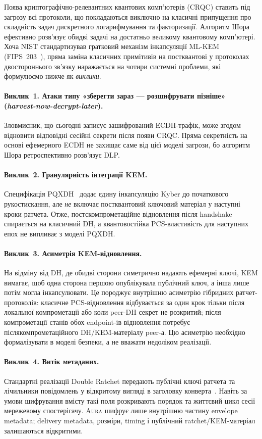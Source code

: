 \documentclass[11pt,a4paper]{article}
\theoremstyle{definition}
\newcommand{\Aura}{\mbox{\normalfont\scshape Aura}}
\begin{document}
Поява криптографічно-релевантних квантових комп'ютерів (CRQC) ставить під
загрозу всі протоколи, що покладаються виключно на класичні припущення про
складність задач дискретного логарифмування та факторизації. Алгоритм
Шора~\cite{shor1997} ефективно розв'язує обидві задачі на достатньо великому
квантовому комп'ютері. Хоча NIST стандартизував гратковий механізм
інкапсуляції ML-KEM (FIPS~203~\cite{fips203}), пряма заміна класичних
примітивів на постквантові у протоколах двостороннього зв'язку наражається
на чотири системні проблеми, які формулюємо нижче як \emph{виклики}.

\paragraph{Виклик~1. Атаки типу «зберегти зараз — розшифрувати пізніше»
(\emph{harvest-now-decrypt-later}).}
Зловмисник, що сьогодні записує зашифрований ECDH-трафік, може згодом
відновити відповідні сесійні секрети після появи CRQC. Пряма секретність на
основі ефемерного ECDH не захищає саме від цієї моделі загрози, бо алгоритм
Шора ретроспективно розв'язує DLP.

\paragraph{Виклик~2. Гранулярність інтеграції KEM.}
Специфікація PQXDH~\cite{signal-pqxdh} додає єдину інкапсуляцію Kyber до
початкового рукостискання, але \emph{не} включає постквантовий ключовий
матеріал у наступні кроки ратчета. Отже, постскомпрометаційне відновлення
після handshake спирається на класичний DH, а квантовостійка PCS-властивість
для наступних епох не випливає з моделі PQXDH.

\paragraph{Виклик~3. Асиметрія KEM-відновлення.}
На відміну від DH, де обидві сторони симетрично надають ефемерні ключі,
KEM вимагає, щоб одна сторона першою опублікувала публічний ключ, а інша
лише потім могла інкапсулювати. Це породжує внутрішню асиметрію
гібридних ратчет-протоколів: класичне PCS-відновлення відбувається
за один крок тільки після локальної компрометації або коли peer-DH секрет
не розкритий; після компрометації станів обох endpoint-ів відновлення
потребує післякомпрометаційного DH/KEM-матеріалу peer-а. Цю асиметрію
необхідно формалізувати в моделі
безпеки, а не вважати недоліком реалізації.

\paragraph{Виклик~4. Витік метаданих.}
Стандартні реалізації Double Ratchet передають публічні ключі ратчета та
лічильники повідомлень у відкритому вигляді в заголовку
конверта~\cite{signal-double-ratchet}. Навіть за умови шифрування вмісту
такі поля розкривають порядок та життєвий цикл сесії мережевому
спостерігачу. \Aura{} шифрує лише внутрішню частину envelope metadata;
delivery metadata, розміри, timing і публічний ratchet/KEM-матеріал
залишаються відкритими.
\end{document}
